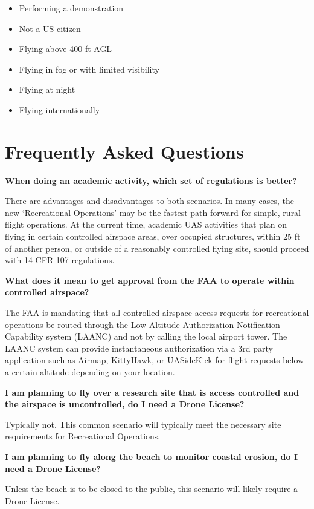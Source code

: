 \documentclass[
]{book}
\providecommand{\tightlist}{%
  \setlength{\itemsep}{0pt}\setlength{\parskip}{0pt}}
\begin{document}
\begin{itemize}
\tightlist
\item
  Performing a demonstration
\item
  Not a US citizen
\item
  Flying above 400 ft AGL
\item
  Flying in fog or with limited visibility
\item
  Flying at night
\item
  Flying internationally
\end{itemize}

\hypertarget{frequently-asked-questions}{%
\section{Frequently Asked Questions}\label{frequently-asked-questions}}

\textbf{When doing an academic activity, which set of regulations is better?}

There are advantages and disadvantages to both scenarios. In many cases, the new `Recreational Operations' may be the fastest path forward for simple, rural flight operations. At the current time, academic UAS activities that plan on flying in certain controlled airspace areas, over occupied structures, within 25 ft of another person, or outside of a reasonably controlled flying site, should proceed with 14 CFR 107 regulations.

\textbf{What does it mean to get approval from the FAA to operate within controlled airspace?}

The FAA is mandating that all controlled airspace access requests for recreational operations be routed through the Low Altitude Authorization Notification Capability system (LAANC) and not by calling the local airport tower. The LAANC system can provide instantaneous authorization via a 3rd party application such as Airmap, KittyHawk, or UASideKick for flight requests below a certain altitude depending on your location.

\textbf{I am planning to fly over a research site that is access controlled and the airspace is uncontrolled, do I need a Drone License?}

Typically not. This common scenario will typically meet the necessary site requirements for Recreational Operations.

\textbf{I am planning to fly along the beach to monitor coastal erosion, do I need a Drone License?}

Unless the beach is to be closed to the public, this scenario will likely require a Drone License.
\end{document}
